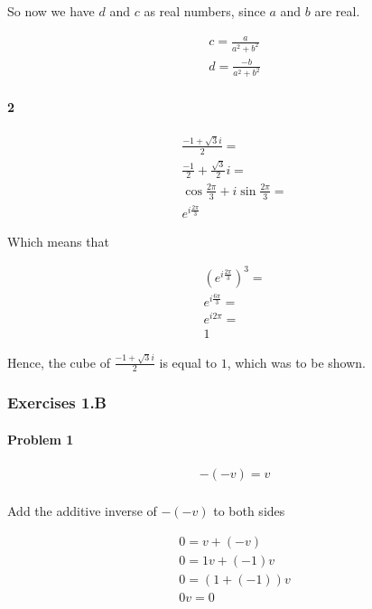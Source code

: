 So now we have $d$ and $c$ as real numbers, since $a$ and $b$ are real.

\begin{align*}
	c = \frac{a}{a^2+b^2} \\
	d = \frac{-b}{a^2+b^2}
\end{align*}
\dotfill

\paragraph{2}

\begin{align*}
	\frac{-1+\sqrt{3}i}{2} = \\
	\frac{-1}{2} + \frac{\sqrt{3}}{2}i = \\
	\cos \frac{2\pi}{3} + i\sin \frac{2\pi}{3} = \\
	e^{i\frac{2\pi}{3}}
\end{align*}

Which means that 

\begin{align*}
	\left( e^{i\frac{2\pi}{3}} \right)^3 = \\
	e^{i\frac{6\pi}{3}} = \\
	e^{i2\pi} = \\
	1
\end{align*}

Hence, the cube of $\frac{-1+\sqrt{3}i}{2}$ is equal to $1$, which was to be shown.

\subsubsection{Exercises 1.B}

\paragraph{Problem 1}

\begin{align*}
	-(-v) = v \\
\end{align*}

Add the additive inverse of $-(-v)$ to both sides

\begin{align*}
	0 = v+(-v) \\
	0 = 1v + (-1)v \\
	0 = (1 + (-1))v \\
	0v = 0
\end{align*}

